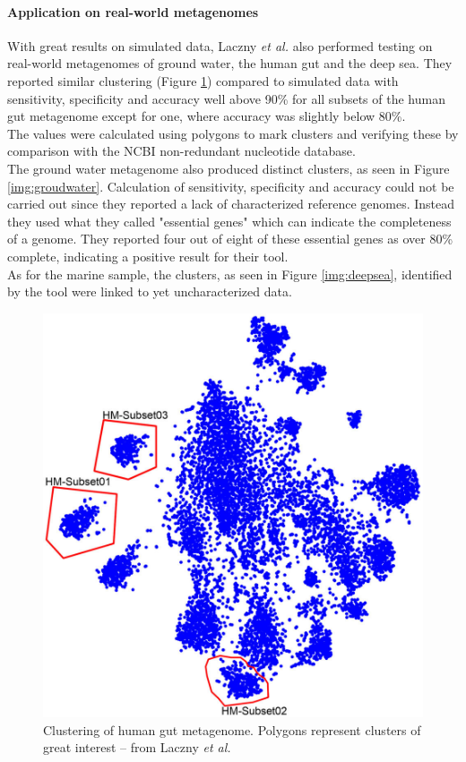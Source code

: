 \documentclass[twocolumn]{bmcart}%
\begin{document}
\paragraph*{Application on real-world metagenomes}
With great results on simulated data, Laczny \textit{et al.} also performed testing on real-world metagenomes of ground water\cite{Wrighton1661}, the human gut \cite{Arumugam2011} and the deep sea\cite{Konstantinidis15082009}. They reported similar clustering (Figure \ref{img:humangut}) compared to simulated data with sensitivity, specificity and accuracy well above 90\% for all subsets of the human gut metagenome except for one, where accuracy was slightly below 80\%.\\
The values were calculated using polygons to mark clusters and verifying these by comparison with the NCBI non-redundant nucleotide database.\\
The ground water metagenome also produced distinct clusters, as seen in Figure \ref{img:groudwater}. Calculation of sensitivity, specificity and accuracy could not be carried out since they reported a lack of characterized reference genomes. Instead they used what they called "essential genes" which can indicate the completeness of a genome. They reported four out of eight of these essential genes as over 80\% complete, indicating a positive result for their tool.\\
As for the marine sample, the clusters, as seen in Figure \ref{img:deepsea}, identified by the tool were linked to yet  uncharacterized data.
	\begin{figure}[h!]
		\includegraphics[width=.9\linewidth]{bilder/humangutCluster.jpg}
		\caption{Clustering of human gut metagenome. Polygons represent clusters of great interest -- from Laczny \textit{et al.}\cite{Laczny2014}}
\label{img:humangut}	
\end{figure}%
\end{document}
